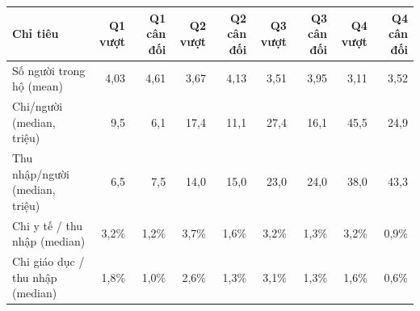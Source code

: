 \begin{tabular}{lrrrrrrrr}
\toprule
Chỉ tiêu & Q1 vượt & Q1 cân đối & Q2 vượt & Q2 cân đối & Q3 vượt & Q3 cân đối & Q4 vượt & Q4 cân đối \\
\midrule
Số người trong hộ (mean) & 4,03 & 4,61 & 3,67 & 4,13 & 3,51 & 3,95 & 3,11 & 3,52 \\
Chi/người (median, triệu) & 9,5 & 6,1 & 17,4 & 11,1 & 27,4 & 16,1 & 45,5 & 24,9 \\
Thu nhập/người (median, triệu) & 6,5 & 7,5 & 14,0 & 15,0 & 23,0 & 24,0 & 38,0 & 43,3 \\
Chi y tế / thu nhập (median) & 3,2\% & 1,2\% & 3,7\% & 1,6\% & 3,2\% & 1,3\% & 3,2\% & 0,9\% \\
Chi giáo dục / thu nhập (median) & 1,8\% & 1,0\% & 2,6\% & 1,3\% & 3,1\% & 1,3\% & 1,6\% & 0,6\% \\
\bottomrule
\end{tabular}
